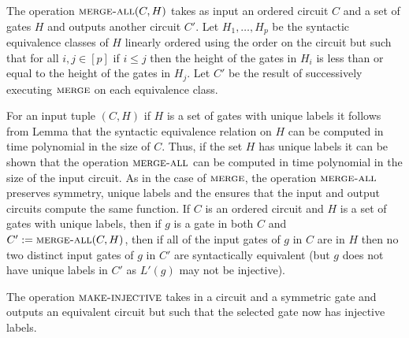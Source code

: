 \documentclass[../paper.tex]{subfiles}
\begin{document}
\begin{definition}
  The operation ${\normalfont\textsc{merge-all}}(C, H)$ takes as input an ordered circuit $C$ and
  a set of gates $H$ and outputs another circuit $C'$. Let $H_1, \ldots, H_p$ be
  the syntactic equivalence classes of $H$ linearly ordered using the order on
  the circuit but such that for all $i, j \in [p]$ if $i \leq j$ then the height
  of the gates in $H_i$ is less than or equal to the height of the gates in
  $H_j$. Let $C'$ be the result of successively executing ${\normalfont\textsc{merge}}$ on each
  equivalence class.
\end{definition}

For an input tuple $(C, H)$ if $H$ is a set of gates with unique labels it
follows from Lemma \cite{} that the syntactic equivalence relation on $H$ can be
computed in time polynomial in the size of $C$. Thus, if the set $H$ has unique
labels it can be shown that the operation ${\normalfont\textsc{merge-all}}$ can be computed in
time polynomial in the size of the input circuit. As in the case of
${\normalfont\textsc{merge}}$, the operation ${\normalfont\textsc{merge-all}}$ preserves symmetry, unique labels
and the ensures that the input and output circuits compute the same function. If
$C$ is an ordered circuit and $H$ is a set of gates with unique labels, then if
$g$ is a gate in both $C$ and $C' := {\normalfont\textsc{merge-all}}(C, H)$, then if all of the
input gates of $g$ in $C$ are in $H$ then no two distinct input gates of $g$ in
$C'$ are syntactically equivalent (but $g$ does not have unique labels in $C'$
as $L'(g)$ may not be injective).


The operation ${\normalfont\textsc{make-injective}}$ takes in a circuit and a symmetric gate and
outputs an equivalent circuit but such that the selected gate now has injective
labels.
\end{document}

